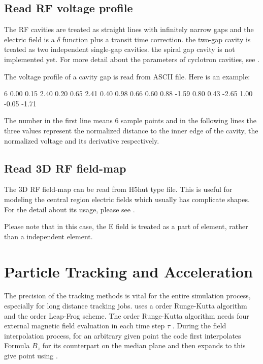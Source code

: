 \subsection{Read RF voltage profile}
The RF cavities are treated as straight lines with infinitely narrow gaps
and the electric field is a $\delta$ function plus a transit time correction.
the two-gap cavity is treated as two independent single-gap cavities. the spiral gap cavity is not implemented yet.
For more detail about the parameters of cyclotron cavities, see .

The voltage profile of a cavity gap  is read from ASCII file. Here is an example:
\begin{example}
6
0.00      0.15      2.40
0.20      0.65      2.41
0.40      0.98      0.66
0.60      0.88     -1.59
0.80      0.43     -2.65
1.00     -0.05     -1.71
\end{example}
The number in the first line means 6 sample points and in the following lines the three values represent the normalized distance to
the inner edge of the cavity, the normalized voltage and its derivative respectively.

\subsection{Read 3D RF field-map}
The 3D RF field-map can be read from H5hut type file. This is useful for modeling the central region electric fields which usually has complicate shapes. For the detail about its usage, please see .

Please note that in this case, the E field is treated as a part of  element, rather than a independent  element.
\section{Particle Tracking and Acceleration}

The precision of the tracking methods is vital for the entire simulation process, especially for long distance tracking jobs.
\opalcycl uses a  order Runge-Kutta algorithm and the  order Leap-Frog scheme. The  order Runge-Kutta algorithm needs four external magnetic field evaluation in each time step $\tau$ .
During the field interpolation process, for an arbitrary given point the code first interpolates Formula $B_z$
for its counterpart on the median plane and then expands to this give point using .

